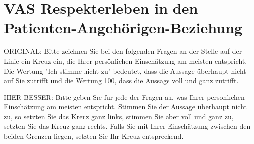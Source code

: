 \setcounter{section}{15}
\section{VAS Respekterleben in den Patienten-Angehörigen-Beziehung  }

ORIGINAL:
Bitte zeichnen Sie bei den folgenden Fragen an der Stelle auf der Linie ein Kreuz ein, die Ihrer persönlichen Einschätzung am meisten entspricht. Die Wertung "Ich stimme nicht zu" bedeutet, dass die Aussage überhaupt nicht auf Sie zutrifft und die Wertung 100, dass die Aussage voll und ganz zutrifft.

HIER BESSER:
Bitte geben Sie für jede der Fragen an, was Ihrer persönlichen Einschätzung am meisten entspricht. Stimmen Sie der Aussage überhaupt nicht zu, so setzten Sie das Kreuz ganz links, stimmen Sie aber voll und ganz zu, setzten Sie das Kreuz ganz rechts. Falls Sie mit Ihrer Einschätzung zwischen den beiden Grenzen liegen, setzten Sie Ihr Kreuz entsprechend.

\vspace{3ex}
\setcounter{markcheckboxcount}{11}
\vspace{3ex}
\setcounter{markcheckboxcount}{11}
\vspace{3ex}
